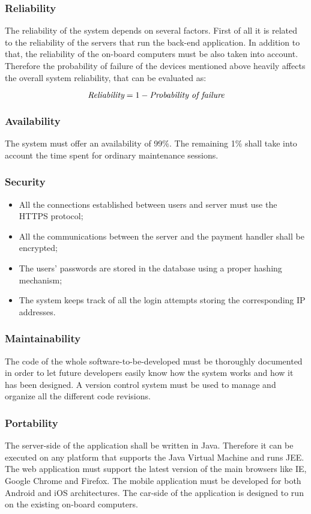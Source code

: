 \subsubsection{Reliability}
The reliability of the system depends on several factors. First of all it is related to the reliability of the servers that run the back-end application. In addition to that, the reliability of the on-board computers must be also taken into account. Therefore the probability of failure of the devices mentioned above heavily affects the overall system reliability, that can be evaluated as:
\begin{center}
	\[\emph{Reliability} = 1-\emph{Probability of failure}\]
\end{center}

\subsubsection{Availability}
The system must offer an availability of 99\%. The remaining 1\% shall take into account the time spent for ordinary maintenance sessions.

\subsubsection{Security}
\begin{itemize}
\item All the connections established between users and server must use the HTTPS protocol;
\item All the communications between the server and the payment handler shall be encrypted;
\item The users' passwords are stored in the database using a proper hashing mechanism;
\item The system keeps track of all the login attempts storing the corresponding IP addresses.
\end{itemize}

\subsubsection{Maintainability}
The code of the whole software-to-be-developed must be thoroughly documented in order to let future developers easily know how the system works and how it has been designed. A version control system must be used to manage and organize all the different code revisions.

\subsubsection{Portability}
The server-side of the application shall be written in Java. Therefore it can be executed on any platform that supports the Java Virtual Machine and runs JEE. The web application must support the latest version of the main browsers like IE, Google Chrome and Firefox. The mobile application must be developed for both Android and iOS architectures.
The car-side of the application is designed to run on the existing on-board computers.
